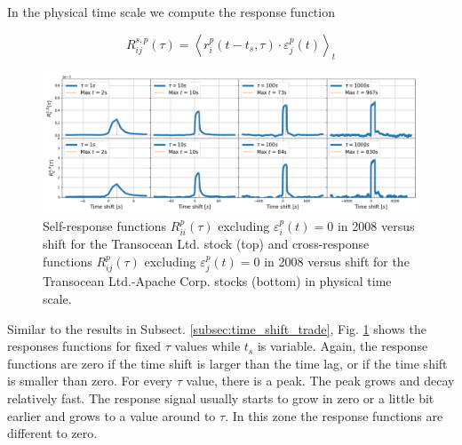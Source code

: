 In the physical time scale we compute the response function

\begin{equation}\label{eq:time_shift_physical}
    R_{ij}^{s, p}\left(\tau\right)=\left\langle r^{p}_{i}
    \left(t-t_{s},\tau\right) \cdot\varepsilon^{p}_{j}
    \left(t\right)\right\rangle _{t}
\end{equation}

\begin{figure}[htbp]
    \centering
    \includegraphics[width=\textwidth]{figures/04_shift_physical_RIG_APA.png}
    \caption{Self-response functions $R_{ii}^{p}\left(\tau\right)$ excluding
             $\varepsilon^{p}_{i}\left(t\right) = 0$ in 2008 versus shift for
             the Transocean Ltd. stock (top) and cross-response functions
             $R_{ij}^{p}\left(\tau\right)$ excluding
             $\varepsilon^{p}_{j}\left(t\right) = 0$ in 2008 versus shift for
             the Transocean Ltd.-Apache Corp. stocks (bottom) in physical time
             scale.}
    \label{fig:shift_physical_scale}
\end{figure}

Similar to the results in Subsect. \ref{subsec:time_shift_trade}, Fig.
\ref{fig:shift_physical_scale} shows the responses functions for fixed $\tau$
values while $t_{s}$ is variable. Again, the response functions are zero if the
time shift is larger than the time lag, or if the time shift is smaller than
zero. For every $\tau$ value, there is a peak. The peak grows and decay
relatively fast. The response signal usually starts to grow in zero or a little
bit earlier and grows to a value around to $\tau$. In this zone the response
functions are different to zero.

